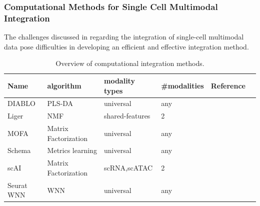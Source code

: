 \subsubsection{Computational Methods for Single Cell Multimodal Integration}
\label{bgInte:integration}
The challenges discussed in  regarding the integration of single-cell multimodal data pose difficulties in developing an efficient and effective integration method.

\begin{table}[!ht]
	\small
	\centering
	\begin{tabular}{llllll}
		\toprule
		Name & algorithm & modality types & \#modalities & Reference \\
		\midrule
    DIABLO & PLS-DA & universal & any & \cite{singh2019diablo}\\
    Liger & NMF & shared-features& 2 & \cite{kriebel2021nonnegative} \\
		MOFA   &  Matrix Factorization & universal & any &  \cite{argelaguet2020mofa+} \\
		Schema & Metrics learning  & universal & any & \cite{singh2021schema} \\
    scAI & Matrix Factorization & scRNA,scATAC & 2 & \cite{jin2020scai}\\
		Seurat WNN	 & WNN & universal & any & \cite{hao2021seurat4} \\
		\bottomrule
	\end{tabular}
	\vspace{0.1cm}
	\caption[Overview of computational integration methods]{Overview of computational integration methods.}
	\label{tab:methods_integration_overview}
\end{table}

